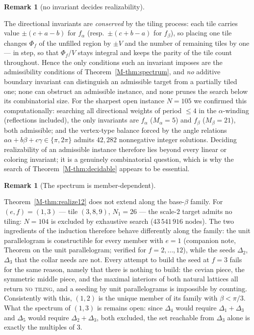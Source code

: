 \documentclass[11pt,reqno]{amsart}
\theoremstyle{plain}
\theoremstyle{definition}
\newtheorem{remark}[theorem]{Remark}
\begin{document}
\begin{remark}[no invariant decides realizability]\label{OM-conserved}

The directional invariants are \emph{conserved} by the tiling process: each tile carries value
$\pm(c+a-b)$ for $f_\alpha$ (resp.\ $\pm(c+b-a)$ for $f_\beta$), so placing one tile changes
$\Phi_f$ of the unfilled region by $\pm V$ and the number of remaining tiles by one --- in step,
so that $\Phi_f/V$ stays integral and keeps the parity of the tile count throughout. Hence the
only conditions such an invariant imposes are the admissibility conditions of
Theorem~\ref{M-thm:spectrum}, and \emph{no} additive boundary invariant can distinguish an admissible
target from a partially tiled one; none can obstruct an admissible instance, and none prunes the
search below its combinatorial size. For the sharpest open instance $N=105$ we confirmed this
computationally: searching all directional weights of period $\le4$ in the $\alpha$-winding
(reflections included), the only invariants are $f_\alpha$ ($M_\alpha=5$) and $f_\beta$
($M_\beta=21$), both admissible; and the vertex-type balance forced by the angle relations
$a\alpha+b\beta+c\gamma\in\{\pi,2\pi\}$ admits $42{,}282$ nonnegative integer solutions. Deciding
realizability of an admissible instance therefore lies beyond every linear or coloring invariant;
it is a genuinely combinatorial question, which is why the search of Theorem~\ref{M-thm:decidable}
appears to be essential.
\end{remark}

\begin{remark}[The spectrum is member-dependent]\label{OM-memberdep}

Theorem~\ref{M-thm:realize12} does not extend along the base-$\beta$ family. For $(e,f)=(1,3)$ --- tile
$(3,8,9)$, $N_1=26$ --- the scale-$2$ target admits no tiling: $N=104$ is excluded by exhaustive
search ($43\,541\,916$ nodes). The two ingredients of the induction therefore behave differently
along the family: the unit parallelogram is constructible for every member with $e=1$ (companion
note, Theorem on the unit parallelogram; verified for $f=2,\dots,12$), while the seeds $\Delta_2$,
$\Delta_3$ that the collar needs are not. Every attempt to build the seed at $f=3$ fails for the same
reason, namely that there is nothing to build: the cevian piece, the symmetric middle piece, and the
maximal interiors of both natural lattices all return \textsc{no tiling}, and a seeding by unit
parallelograms is impossible by counting. Consistently with this, $(1,2)$ is the unique member of its
family with $\beta<\pi/3$. What the spectrum of $(1,3)$ is remains open: since $\Delta_4$ would
require $\Delta_1+\Delta_3$ and $\Delta_5$ would require $\Delta_2+\Delta_3$, both excluded, the set
reachable from $\Delta_3$ alone is exactly the multiples of $3$.
\end{remark}
\end{document}
